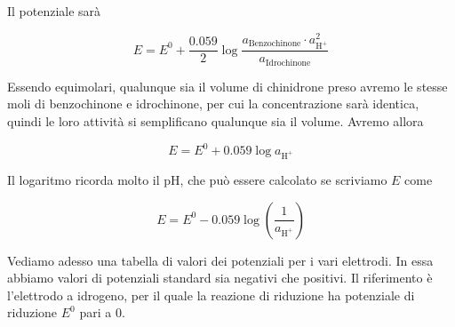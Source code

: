 Il potenziale sarà

$$E = E^0 + \frac{0.059}{2} \log \frac{a_{\text{Benzochinone}} \cdot a^2_{\text{H}^+}}{a_{\text{Idrochinone}}}$$

Essendo equimolari, qualunque sia il volume di chinidrone preso avremo le stesse moli di benzochinone e idrochinone, per cui la concentrazione sarà identica, quindi le loro attività si semplificano qualunque sia il volume. Avremo allora

$$E = E^0 + 0.059 \log a_{\text{H}^+}$$

Il logaritmo ricorda molto il pH, che può essere calcolato se scriviamo $E$ come

$$E = E^0 - 0.059 \log \left( \frac{1}{a_{\text{H}^+}} \right)$$

\vspace{1cm}Vediamo adesso una tabella di valori dei potenziali per i vari elettrodi. In essa abbiamo valori di potenziali standard sia negativi che positivi. Il riferimento è l'elettrodo a idrogeno, per il quale la reazione di riduzione ha potenziale di riduzione $E^0$ pari a 0. 

